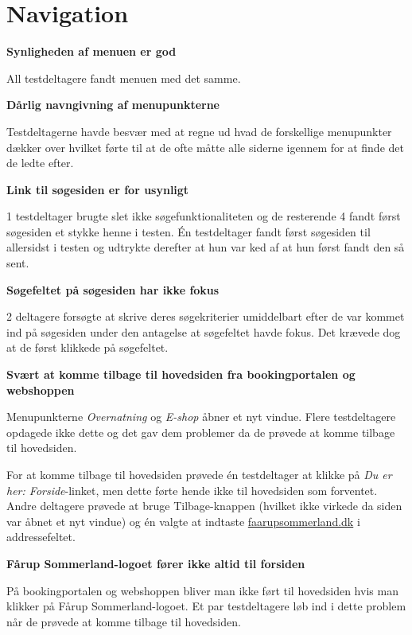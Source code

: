 \documentclass[10pt,a4paper]{article}      %
\newcommand\pic[1]{\texttt{[image: Pics/\#1]}}
\renewcommand\good{\pic{good}}
\renewcommand\smallproblem{\pic{smallproblem}}
\renewcommand\seriousproblem{\pic{seriousproblem}}
\begin{document}
\section{Navigation}
\begin{kommentarer}

\item[\good] \textbf{Synligheden af menuen er god}

All testdeltagere fandt menuen med det samme.

\item[\seriousproblem] \textbf{Dårlig navngivning af menupunkterne}

Testdeltagerne havde besvær med at regne ud hvad de forskellige
menupunkter dækker over hvilket førte til at de ofte måtte alle siderne igennem for at finde
det de ledte efter.

\item[\smallproblem] \textbf{Link til søgesiden er for usynligt}

1 testdeltager brugte slet ikke søgefunktionaliteten og de resterende 4 fandt først søgesiden
et stykke henne i testen. Én testdeltager fandt først søgesiden til allersidst i testen og
udtrykte derefter at hun var ked af at hun først fandt den så sent.

\item[\smallproblem] \textbf{Søgefeltet på søgesiden har ikke fokus}

2 deltagere forsøgte at skrive deres søgekriterier umiddelbart efter de var kommet ind på
søgesiden under den antagelse at søgefeltet havde fokus. Det krævede dog at de først klikkede
på søgefeltet.

\item[\smallproblem] \textbf{Svært at komme tilbage til hovedsiden fra bookingportalen og webshoppen}

Menupunkterne \emph{Overnatning} og \emph{E-shop} åbner et nyt vindue. Flere testdeltagere
opdagede ikke dette og det gav dem problemer da de prøvede at komme tilbage til hovedsiden.

For at komme tilbage til hovedsiden prøvede én testdeltager at klikke på \emph{Du er her:
Forside}-linket, men dette førte hende ikke til hovedsiden som forventet. Andre deltagere
prøvede at bruge Tilbage-knappen (hvilket ikke virkede da siden var åbnet et nyt vindue)
og én valgte at indtaste \url{faarupsommerland.dk} i addressefeltet.

\item[\smallproblem] \textbf{Fårup Sommerland-logoet fører ikke altid til forsiden}

På bookingportalen og webshoppen bliver man ikke ført til hovedsiden hvis man klikker på Fårup
Sommerland-logoet. Et par testdeltagere løb ind i dette problem når de prøvede at komme
tilbage til hovedsiden.

\end{kommentarer}
\end{document}
